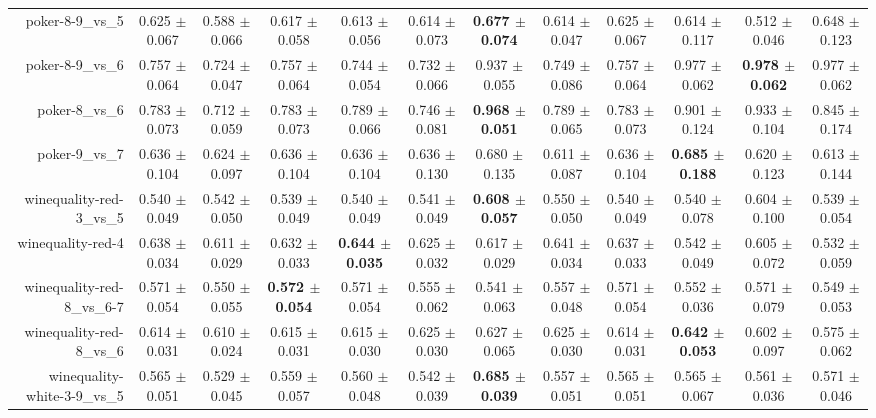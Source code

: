 \begin{table}[!ht]
{\begin{tabular}{r c c c c c c c c c c c}
poker-8-9\_vs\_5 & 0.625 $\pm$ 0.067 & 0.588 $\pm$ 0.066 & 0.617 $\pm$ 0.058 & 0.613 $\pm$ 0.056 & 0.614 $\pm$ 0.073 & \textbf{0.677 $\pm$ 0.074} & 0.614 $\pm$ 0.047 & 0.625 $\pm$ 0.067 & 0.614 $\pm$ 0.117 & 0.512 $\pm$ 0.046 & 0.648 $\pm$ 0.123 \\
poker-8-9\_vs\_6 & 0.757 $\pm$ 0.064 & 0.724 $\pm$ 0.047 & 0.757 $\pm$ 0.064 & 0.744 $\pm$ 0.054 & 0.732 $\pm$ 0.066 & 0.937 $\pm$ 0.055 & 0.749 $\pm$ 0.086 & 0.757 $\pm$ 0.064 & 0.977 $\pm$ 0.062 & \textbf{0.978 $\pm$ 0.062} & 0.977 $\pm$ 0.062 \\
poker-8\_vs\_6 & 0.783 $\pm$ 0.073 & 0.712 $\pm$ 0.059 & 0.783 $\pm$ 0.073 & 0.789 $\pm$ 0.066 & 0.746 $\pm$ 0.081 & \textbf{0.968 $\pm$ 0.051} & 0.789 $\pm$ 0.065 & 0.783 $\pm$ 0.073 & 0.901 $\pm$ 0.124 & 0.933 $\pm$ 0.104 & 0.845 $\pm$ 0.174 \\
poker-9\_vs\_7 & 0.636 $\pm$ 0.104 & 0.624 $\pm$ 0.097 & 0.636 $\pm$ 0.104 & 0.636 $\pm$ 0.104 & 0.636 $\pm$ 0.130 & 0.680 $\pm$ 0.135 & 0.611 $\pm$ 0.087 & 0.636 $\pm$ 0.104 & \textbf{0.685 $\pm$ 0.188} & 0.620 $\pm$ 0.123 & 0.613 $\pm$ 0.144 \\
winequality-red-3\_vs\_5 & 0.540 $\pm$ 0.049 & 0.542 $\pm$ 0.050 & 0.539 $\pm$ 0.049 & 0.540 $\pm$ 0.049 & 0.541 $\pm$ 0.049 & \textbf{0.608 $\pm$ 0.057} & 0.550 $\pm$ 0.050 & 0.540 $\pm$ 0.049 & 0.540 $\pm$ 0.078 & 0.604 $\pm$ 0.100 & 0.539 $\pm$ 0.054 \\
winequality-red-4 & 0.638 $\pm$ 0.034 & 0.611 $\pm$ 0.029 & 0.632 $\pm$ 0.033 & \textbf{0.644 $\pm$ 0.035} & 0.625 $\pm$ 0.032 & 0.617 $\pm$ 0.029 & 0.641 $\pm$ 0.034 & 0.637 $\pm$ 0.033 & 0.542 $\pm$ 0.049 & 0.605 $\pm$ 0.072 & 0.532 $\pm$ 0.059 \\
winequality-red-8\_vs\_6-7 & 0.571 $\pm$ 0.054 & 0.550 $\pm$ 0.055 & \textbf{0.572 $\pm$ 0.054} & 0.571 $\pm$ 0.054 & 0.555 $\pm$ 0.062 & 0.541 $\pm$ 0.063 & 0.557 $\pm$ 0.048 & 0.571 $\pm$ 0.054 & 0.552 $\pm$ 0.036 & 0.571 $\pm$ 0.079 & 0.549 $\pm$ 0.053 \\
winequality-red-8\_vs\_6 & 0.614 $\pm$ 0.031 & 0.610 $\pm$ 0.024 & 0.615 $\pm$ 0.031 & 0.615 $\pm$ 0.030 & 0.625 $\pm$ 0.030 & 0.627 $\pm$ 0.065 & 0.625 $\pm$ 0.030 & 0.614 $\pm$ 0.031 & \textbf{0.642 $\pm$ 0.053} & 0.602 $\pm$ 0.097 & 0.575 $\pm$ 0.062 \\
winequality-white-3-9\_vs\_5 & 0.565 $\pm$ 0.051 & 0.529 $\pm$ 0.045 & 0.559 $\pm$ 0.057 & 0.560 $\pm$ 0.048 & 0.542 $\pm$ 0.039 & \textbf{0.685 $\pm$ 0.039} & 0.557 $\pm$ 0.051 & 0.565 $\pm$ 0.051 & 0.565 $\pm$ 0.067 & 0.561 $\pm$ 0.036 & 0.571 $\pm$ 0.046 \\

\end{tabular}}
\end{table}
